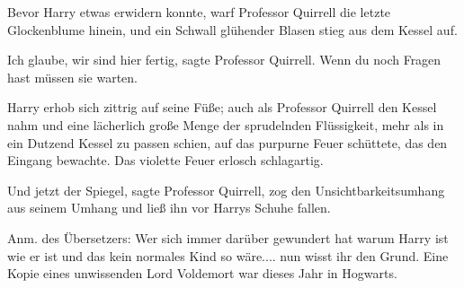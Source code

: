 Bevor Harry etwas erwidern konnte, warf Professor Quirrell die letzte
Glockenblume hinein, und ein Schwall glühender Blasen stieg aus dem Kessel auf.

\glqq{}Ich glaube, wir sind hier fertig\grqq{}, sagte Professor Quirrell. \glqq{}
Wenn du noch Fragen hast müssen sie warten.\grqq{}

Harry erhob sich zittrig auf seine Füße; auch als Professor Quirrell den Kessel
nahm und eine lächerlich große Menge der sprudelnden Flüssigkeit, mehr als in
ein Dutzend Kessel zu passen schien, auf das purpurne Feuer schüttete, das den
Eingang bewachte. Das violette Feuer erlosch schlagartig.

\glqq{}Und jetzt der Spiegel\grqq{}, sagte Professor Quirrell, zog den
Unsichtbarkeitsumhang aus seinem Umhang und ließ ihn vor Harrys Schuhe fallen.


Anm. des Übersetzers: Wer sich immer darüber gewundert hat warum Harry ist wie
er ist und das kein normales Kind so wäre.... nun wisst ihr den Grund. Eine
Kopie eines unwissenden Lord Voldemort war dieses Jahr in Hogwarts.

